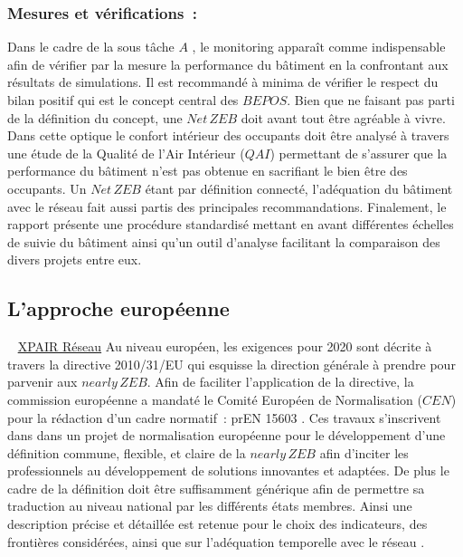 \subsubsection{Mesures et vérifications~:} %
\label{ssub:mesures_et_verifications}
Dans le cadre de la sous tâche $A$ \parencite{Noris2013}, le monitoring apparaît comme indispensable
afin de vérifier par la mesure la performance du bâtiment en la confrontant aux
résultats de simulations. Il est recommandé à minima de vérifier le respect du bilan
positif qui est le concept central des $BEPOS$. Bien que ne faisant pas parti de
la définition du concept, une $Net\,ZEB$ doit avant tout être agréable à vivre. Dans cette
optique le confort intérieur des occupants doit être analysé à travers une étude de
la Qualité de l’Air Intérieur ($QAI$) permettant de s’assurer que la performance du bâtiment n’est pas
obtenue en sacrifiant le bien être des occupants. Un $Net\,ZEB$ étant par définition connecté,
l’adéquation du bâtiment avec le réseau fait aussi partis des principales recommandations.
Finalement, le rapport présente une procédure standardisé mettant en avant différentes échelles
de suivie du bâtiment ainsi qu’un outil d’analyse facilitant la comparaison des divers projets entre eux.


\subsection{L’approche européenne} %
\label{ssub:l_approche_europeenne}
~
\href{http://tinyurl.com/y7uqfe8r}{XPAIR Réseau}
Au niveau européen, les exigences pour 2020 sont décrite à travers la directive
2010/31/EU \parencite{EPBD2010} qui esquisse la direction générale à prendre pour
parvenir aux $nearly\,ZEB$. Afin de faciliter l’application de la directive, la commission
européenne a mandaté le Comité Européen de Normalisation ($CEN$)
pour la rédaction d’un cadre normatif~: prEN 15603 . Ces travaux s’inscrivent
dans dans un projet de normalisation européenne pour le développement d’une définition
commune, flexible, et claire de la $nearly\,ZEB$ afin d’inciter les professionnels au développement
de solutions innovantes et adaptées. De plus le cadre de la définition doit être
suffisamment générique afin de permettre sa traduction au niveau national par les différents
états membres. Ainsi une description précise et détaillée est retenue pour le choix des indicateurs,
des frontières considérées, ainsi que sur l’adéquation temporelle avec le réseau \parencite{Zirngibl2014}.


